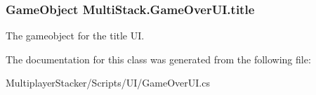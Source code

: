\subsubsection[{title}]{\setlength{\rightskip}{0pt plus 5cm}Game\+Object Multi\+Stack.\+Game\+Over\+U\+I.\+title}\label{class_multi_stack_1_1_game_over_u_i_a05e9dc451638ae9d0a414eb45145f9cc}


The gameobject for the title U\+I. 



The documentation for this class was generated from the following file\+:\begin{DoxyCompactItemize}
\item 
Multiplayer\+Stacker/\+Scripts/\+U\+I/Game\+Over\+U\+I.\+cs\end{DoxyCompactItemize}
